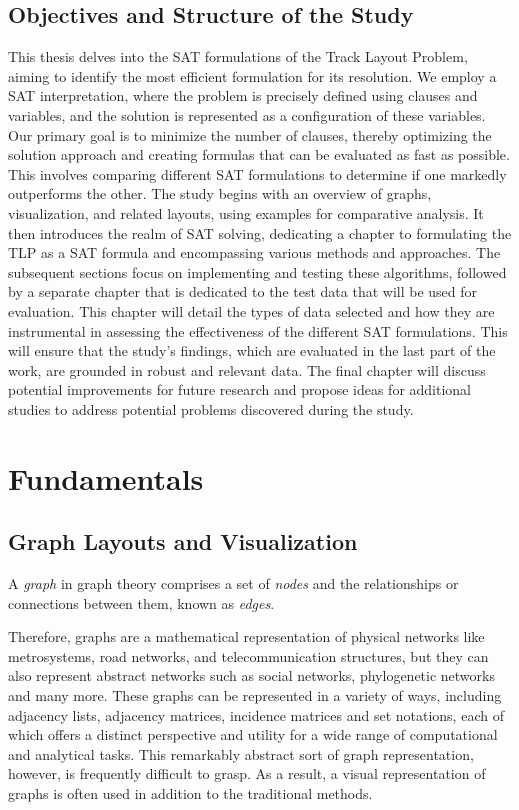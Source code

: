 \documentclass[bachelor, english]{algothesis}
\begin{document}
\section{Objectives and Structure of the Study}
This thesis delves into the SAT formulations of the Track Layout Problem, aiming to identify the most efficient formulation for its resolution. We employ a SAT interpretation, where the problem is precisely defined using clauses and variables, and the solution is represented as a configuration of these variables. Our primary goal is to minimize the number of clauses, thereby optimizing the solution approach and creating formulas that can be evaluated as fast as possible. This involves comparing different SAT formulations to determine if one markedly outperforms the other. \newline
The study begins with an overview of graphs, visualization, and related layouts, using examples for comparative analysis. It then introduces the realm of SAT solving, dedicating a chapter to formulating the TLP as a SAT formula and encompassing various methods and approaches. The subsequent sections focus on implementing and testing these algorithms, followed by a separate chapter that is dedicated to the test data that will be used for evaluation. This chapter will detail the types of data selected and how they are instrumental in assessing the effectiveness of the different SAT formulations. This will ensure that the study's findings, which are evaluated in the last part of the work, are grounded in robust and relevant data. The final chapter will discuss potential improvements for future research and propose ideas for additional studies to address potential problems discovered during the study.

\chapter{Fundamentals}

\section{Graph Layouts and Visualization}
\begin{definition}
    A \emph{graph} in graph theory comprises a set of \emph{nodes} and the relationships or connections between them, known as \emph{edges}.
\end{definition}
\noindent
Therefore, graphs are a mathematical representation of physical networks like metrosystems, road networks, and telecommunication structures, but they can also represent abstract networks such as social networks, phylogenetic networks and many more. These graphs can be represented in a variety of ways, including adjacency lists, adjacency matrices, incidence matrices and set notations, each of which offers a distinct perspective and utility for a wide range of computational and analytical tasks. This remarkably  abstract sort of graph representation, however, is frequently difficult to grasp. As a result, a visual representation of graphs is often used in addition to the traditional methods.
\end{document}
